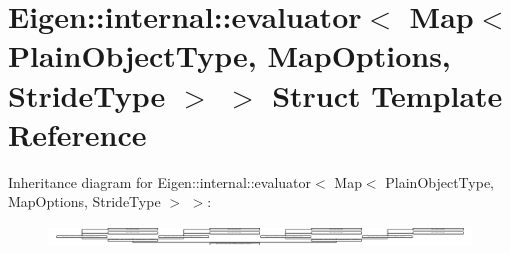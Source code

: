\hypertarget{struct_eigen_1_1internal_1_1evaluator_3_01_map_3_01_plain_object_type_00_01_map_options_00_01_stride_type_01_4_01_4}{}\section{Eigen\+:\+:internal\+:\+:evaluator$<$ Map$<$ Plain\+Object\+Type, Map\+Options, Stride\+Type $>$ $>$ Struct Template Reference}
\label{struct_eigen_1_1internal_1_1evaluator_3_01_map_3_01_plain_object_type_00_01_map_options_00_01_stride_type_01_4_01_4}
Inheritance diagram for Eigen\+:\+:internal\+:\+:evaluator$<$ Map$<$ Plain\+Object\+Type, Map\+Options, Stride\+Type $>$ $>$\+:\begin{figure}[H]
\begin{center}
\leavevmode
\includegraphics[height=0.554675cm]{struct_eigen_1_1internal_1_1evaluator_3_01_map_3_01_plain_object_type_00_01_map_options_00_01_stride_type_01_4_01_4}
\end{center}
\end{figure}
